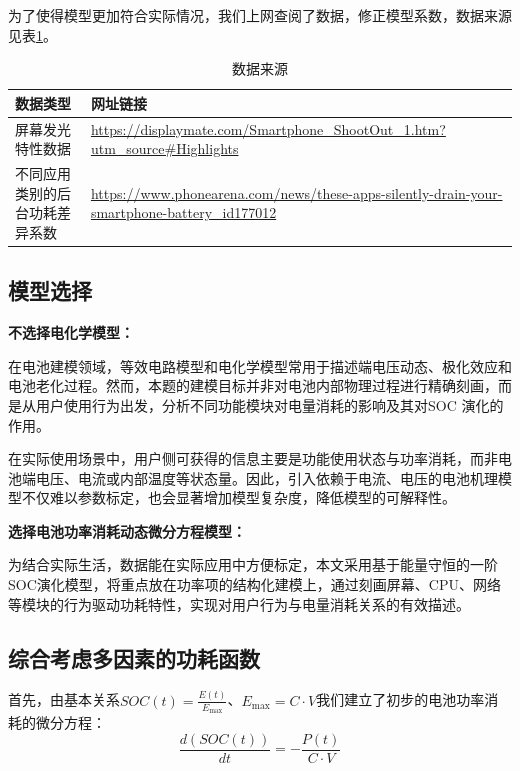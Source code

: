 \documentclass{mcmthesis}  %
\begin{document}
	为了使得模型更加符合实际情况，我们上网查阅了数据，修正模型系数，数据来源见表\ref{数据来源}。
	
	\begin{table}[htbp]
		\centering
		\caption{数据来源} %
		\label{数据来源} %
		\renewcommand{\arraystretch}{1.5}
		\renewcommand{\heavyrulewidth}{1.2pt}
		\begin{tabular}{p{5cm}p{8cm}}
			\toprule
			数据类型 & 网址链接 \\
			\midrule
			屏幕发光特性数据 & \url{https://displaymate.com/Smartphone_ShootOut_1.htm?utm_source#Highlights} \\
			\midrule
			不同应用类别的后台功耗差异系数 & \url{https://www.phonearena.com/news/these-apps-silently-drain-your-smartphone-battery_id177012}
			\\
			\bottomrule
		\end{tabular}
		\renewcommand{\heavyrulewidth}{0.8pt}
	\end{table}
	
	\subsection{模型选择}
	\textbf{不选择电化学模型：}
	
	在电池建模领域，等效电路模型和电化学模型常用于描述端电压动态、极化效应和电池老化过程。然而，本题的建模目标并非对电池内部物理过程进行精确刻画，而是从用户使用行为出发，分析不同功能模块对电量消耗的影响及其对SOC 演化的作用。
	
	在实际使用场景中，用户侧可获得的信息主要是功能使用状态与功率消耗，而非电池端电压、电流或内部温度等状态量。因此，引入依赖于电流、电压的电池机理模型不仅难以参数标定，也会显著增加模型复杂度，降低模型的可解释性。
	
	\textbf{选择电池功率消耗动态微分方程模型：}
	
	为结合实际生活，数据能在实际应用中方便标定，本文采用基于能量守恒的一阶SOC演化模型，将重点放在功率项的结构化建模上，通过刻画屏幕、CPU、网络等模块的行为驱动功耗特性，实现对用户行为与电量消耗关系的有效描述。
	

	\subsection{综合考虑多因素的功耗函数}
	首先，由基本关系$SOC(t) = \frac{E(t)}{E_{\max}}$、$E_{\max} = C \cdot V$我们建立了初步的电池功率消耗的微分方程：
	\begin{equation}
		\frac{d(SOC(t))}{dt} = -\frac{P(t)}{C \cdot V}
	\end{equation}
	
\end{document}
